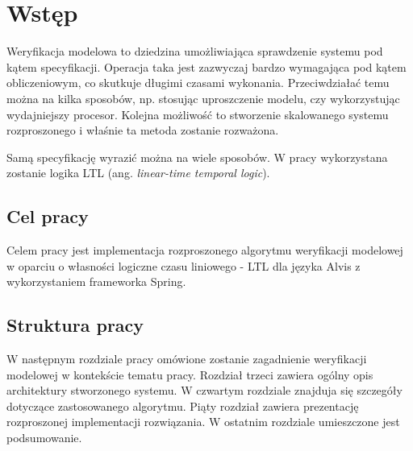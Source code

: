 \chapter{Wstęp}

Weryfikacja modelowa to dziedzina umożliwiająca sprawdzenie systemu pod kątem specyfikacji.
Operacja taka jest zazwyczaj bardzo wymagająca pod kątem obliczeniowym, co skutkuje długimi czasami wykonania. Przeciwdziałać temu można na kilka sposobów, np. stosując uproszczenie modelu, czy wykorzystując wydajniejszy procesor. Kolejna możliwość to stworzenie skalowanego systemu rozproszonego i właśnie ta metoda zostanie rozważona.

Samą specyfikację wyrazić można na wiele sposobów. W pracy wykorzystana zostanie logika LTL (ang. \textit{linear-time temporal logic}).


\section{Cel pracy}

Celem pracy jest implementacja rozproszonego algorytmu weryfikacji modelowej w oparciu o własności logiczne czasu liniowego - LTL dla języka Alvis z wykorzystaniem frameworka Spring.


\section{Struktura pracy}

W następnym rozdziale pracy omówione zostanie zagadnienie weryfikacji modelowej w kontekście tematu pracy.
Rozdział trzeci zawiera ogólny opis architektury stworzonego systemu.
W czwartym rozdziale znajduja się szczegóły dotyczące zastosowanego algorytmu.
Piąty rozdział zawiera prezentację rozproszonej implementacji rozwiązania.
W ostatnim rozdziale umieszczone jest podsumowanie.
